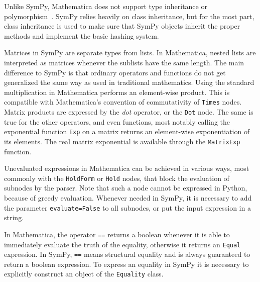 
Unlike SymPy, Mathematica does not support type inheritance or poly\-morph\-ism~\cite{Fateman1992}.
%
SymPy relies heavily on class inheritance, but for the most part,
class inheritance is used to make sure that SymPy objects inherit the proper
methods and implement the basic hashing system.


Matrices in SymPy are separate types from lists.
In Mathematica, nested lists are interpreted as matrices whenever the sublists
have the same length.
The main difference to SymPy is that ordinary operators and functions
do not get generalized the same way as used in traditional mathematics.
Using the standard multiplication in Mathematica performs an element-wise
product. This is compatible with Mathematica's convention of commutativity of
\texttt{Times} nodes.
Matrix products are expressed by the \textit{dot} operator,
or the \texttt{Dot} node.
The same is true for the other operators, and even functions,
most notably calling the exponential function \texttt{Exp} on a matrix
returns an element-wise exponentiation of its elements.
The real matrix exponential is available through the \texttt{MatrixExp}
function.


Unevaluated expressions in Mathematica can be achieved in various ways,
most commonly with the \texttt{HoldForm} or \texttt{Hold} nodes,
that block the evaluation of subnodes by the parser.
Note that such a node cannot be expressed in Python, because of greedy evaluation.
Whenever needed in SymPy, it is necessary to add the parameter \texttt{evaluate=False}
to all subnodes, or put the input expression in a string.


In Mathematica, the operator \texttt{==} returns a boolean whenever it is able
to immediately evaluate the truth of the equality, otherwise it returns an
\texttt{Equal} expression.  In SymPy, \texttt{==} means structural equality and
is always guaranteed to return a boolean expression.  To express an equality in
SymPy it is necessary to explicitly construct an object of the \texttt{Equality}
class.

